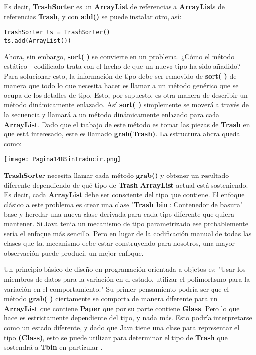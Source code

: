 Es decir, \textbf{TrashSorter} es un \textbf{ArrayList} de referencias a \textbf{ArrayList}s de referencias \textbf{Trash}, y con \textbf{add()} se puede instalar otro, así:  \newline

\begin{lstlisting} 
TrashSorter ts = TrashSorter() 
ts.add(ArrayList()) 
\end{lstlisting}

Ahora, sin embargo, \textbf{sort( )} se convierte en un problema. ¿Cómo el método estático - codificado trata con el hecho de que un nuevo tipo ha sido añadido? Para solucionar esto, la información de tipo debe ser removido de \textbf{sort( )} de manera que todo lo que necesita hacer es llamar a un método genérico que se ocupa de los detalles de tipo. Esto, por supuesto, es otra manera de describir un método dinámicamente enlazado. Así \textbf{sort( )} simplemente se moverá a través de la secuencia y llamará a un método dinámicamente enlazado para cada \textbf{ArrayList}. Dado que el trabajo de este método es tomar las piezas de \textbf{Trash} en que está interesado, este es llamado \textbf{grab(Trash)}. La estructura ahora queda como:       \newline

\texttt{[image: Pagina148SinTraducir.png]}

\textbf{TrashSorter} necesita llamar cada método \textbf{grab()} y obtener un resultado diferente dependiendo de qué tipo de \textbf{Trash} \textbf{ArrayList} actual está sosteniendo. Es decir, cada \textbf{ArrayList} debe ser consciente del tipo que contiene. El enfoque clásico a este problema es crear una clase "\textbf{Trash bin} : Contenedor de basura" base y heredar una nueva clase derivada para cada tipo diferente que quiera mantener. Si Java tenía un mecanismo de tipo parametrizado ese probablemente sería el enfoque más sencillo. Pero en lugar de la codificación manual de todas las clases que tal mecanismo debe estar construyendo para nosotros, una mayor observación puede producir un mejor enfoque.   \newline

Un principio básico de diseño en programación orientada a objetos es: "Usar los miembros de datos para la variación en el estado, utilizar el polimorfismo para la variación en el comportamiento." Su primer pensamiento podría ser que el método \textbf{grab( )} ciertamente se comporta de manera diferente para un \textbf{ArrayList} que contiene \textbf{Paper} que por su parte contiene \textbf{Glass}. Pero lo que hace es estrictamente dependiente del tipo, y nada más. Esto podría interpretarse como un estado diferente, y dado que Java tiene una clase para representar el tipo \textbf{(Class)}, esto se puede utilizar para determinar el tipo de \textbf{Trash} que sostendrá a \textbf{Tbin} en particular .       \newline


